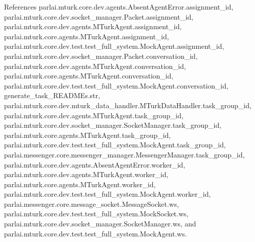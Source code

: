 References parlai.\+mturk.\+core.\+dev.\+agents.\+Absent\+Agent\+Error.\+assignment\+\_\+id, parlai.\+mturk.\+core.\+dev.\+socket\+\_\+manager.\+Packet.\+assignment\+\_\+id, parlai.\+mturk.\+core.\+dev.\+agents.\+M\+Turk\+Agent.\+assignment\+\_\+id, parlai.\+mturk.\+core.\+agents.\+M\+Turk\+Agent.\+assignment\+\_\+id, parlai.\+mturk.\+core.\+dev.\+test.\+test\+\_\+full\+\_\+system.\+Mock\+Agent.\+assignment\+\_\+id, parlai.\+mturk.\+core.\+dev.\+socket\+\_\+manager.\+Packet.\+conversation\+\_\+id, parlai.\+mturk.\+core.\+dev.\+agents.\+M\+Turk\+Agent.\+conversation\+\_\+id, parlai.\+mturk.\+core.\+agents.\+M\+Turk\+Agent.\+conversation\+\_\+id, parlai.\+mturk.\+core.\+dev.\+test.\+test\+\_\+full\+\_\+system.\+Mock\+Agent.\+conversation\+\_\+id, generate\+\_\+task\+\_\+\+R\+E\+A\+D\+M\+Es.\+str, parlai.\+mturk.\+core.\+dev.\+mturk\+\_\+data\+\_\+handler.\+M\+Turk\+Data\+Handler.\+task\+\_\+group\+\_\+id, parlai.\+mturk.\+core.\+dev.\+agents.\+M\+Turk\+Agent.\+task\+\_\+group\+\_\+id, parlai.\+mturk.\+core.\+dev.\+socket\+\_\+manager.\+Socket\+Manager.\+task\+\_\+group\+\_\+id, parlai.\+mturk.\+core.\+agents.\+M\+Turk\+Agent.\+task\+\_\+group\+\_\+id, parlai.\+mturk.\+core.\+dev.\+test.\+test\+\_\+full\+\_\+system.\+Mock\+Agent.\+task\+\_\+group\+\_\+id, parlai.\+messenger.\+core.\+messenger\+\_\+manager.\+Messenger\+Manager.\+task\+\_\+group\+\_\+id, parlai.\+mturk.\+core.\+dev.\+agents.\+Absent\+Agent\+Error.\+worker\+\_\+id, parlai.\+mturk.\+core.\+dev.\+agents.\+M\+Turk\+Agent.\+worker\+\_\+id, parlai.\+mturk.\+core.\+agents.\+M\+Turk\+Agent.\+worker\+\_\+id, parlai.\+mturk.\+core.\+dev.\+test.\+test\+\_\+full\+\_\+system.\+Mock\+Agent.\+worker\+\_\+id, parlai.\+messenger.\+core.\+message\+\_\+socket.\+Message\+Socket.\+ws, parlai.\+mturk.\+core.\+dev.\+test.\+test\+\_\+full\+\_\+system.\+Mock\+Socket.\+ws, parlai.\+mturk.\+core.\+dev.\+socket\+\_\+manager.\+Socket\+Manager.\+ws, and parlai.\+mturk.\+core.\+dev.\+test.\+test\+\_\+full\+\_\+system.\+Mock\+Agent.\+ws.



